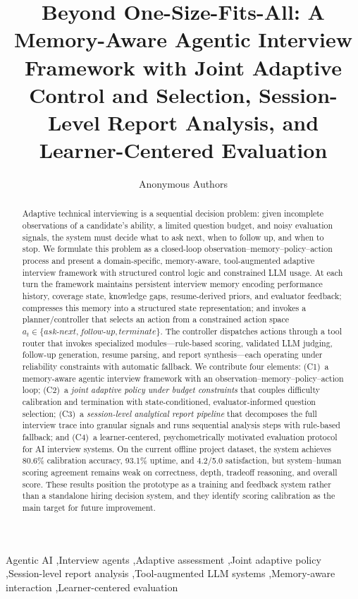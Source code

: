 ﻿\documentclass[final,3p,times,authoryear]{elsarticle}
\begin{document}
\begin{frontmatter}

\title{Beyond One-Size-Fits-All: A Memory-Aware Agentic Interview Framework with Joint Adaptive Control and Selection, Session-Level Report Analysis, and Learner-Centered Evaluation}

\author{Anonymous Authors}

\begin{abstract}
\noindent Adaptive technical interviewing is a sequential decision problem: given incomplete observations of a candidate's ability, a limited question budget, and noisy evaluation signals, the system must decide what to ask next, when to follow up, and when to stop. We formulate this problem as a closed-loop observation--memory--policy--action process and present a domain-specific, memory-aware, tool-augmented adaptive interview framework with structured control logic and constrained LLM usage. At each turn the framework maintains persistent interview memory encoding performance history, coverage state, knowledge gaps, resume-derived priors, and evaluator feedback; compresses this memory into a structured state representation; and invokes a planner/controller that selects an action from a constrained action space $a_t \in \{\textit{ask-next}, \textit{follow-up}, \textit{terminate}\}$. The controller dispatches actions through a tool router that invokes specialized modules---rule-based scoring, validated LLM judging, follow-up generation, resume parsing, and report synthesis---each operating under reliability constraints with automatic fallback. We contribute four elements: (C1)~a memory-aware agentic interview framework with an observation--memory--policy--action loop; (C2)~a \emph{joint adaptive policy under budget constraints} that couples difficulty calibration and termination with state-conditioned, evaluator-informed question selection; (C3)~a \emph{session-level analytical report pipeline} that decomposes the full interview trace into granular signals and runs sequential analysis steps with rule-based fallback; and (C4)~a learner-centered, psychometrically motivated evaluation protocol for AI interview systems. On the current offline project dataset, the system achieves 80.6\% calibration accuracy, 93.1\% uptime, and 4.2/5.0 satisfaction, but system--human scoring agreement remains weak on correctness, depth, tradeoff reasoning, and overall score. These results position the prototype as a training and feedback system rather than a standalone hiring decision system, and they identify scoring calibration as the main target for future improvement.
\end{abstract}

\begin{keyword}
Agentic AI \sep Interview agents \sep Adaptive assessment \sep Joint adaptive policy \sep Session-level report analysis \sep Tool-augmented LLM systems \sep Memory-aware interaction \sep Learner-centered evaluation
\end{keyword}

\end{frontmatter}
\end{document}
